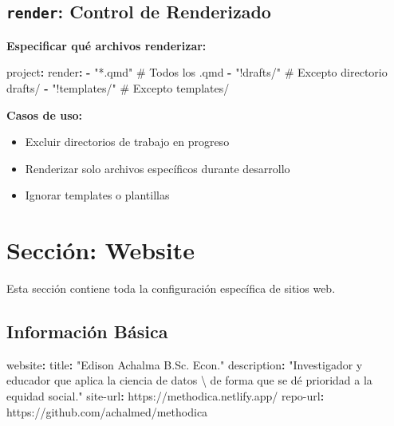 \documentclass[
  doc,
  floatsintext,
  longtable,
  a4paper,
  nolmodern,
  notxfonts,
  notimes,
  12pt,
  colorlinks=true,linkcolor=blue,citecolor=blue,urlcolor=blue]{apa7}
\newenvironment{Shaded}{\begin{snugshade}}{\end{snugshade}}
\newcommand{\AttributeTok}[1]{\textcolor[rgb]{0.40,0.45,0.13}{#1}}
\newcommand{\CommentTok}[1]{\textcolor[rgb]{0.37,0.37,0.37}{#1}}
\newcommand{\FunctionTok}[1]{\textcolor[rgb]{0.28,0.35,0.67}{#1}}
\newcommand{\KeywordTok}[1]{\textcolor[rgb]{0.00,0.23,0.31}{\textbf{#1}}}
\newcommand{\SpecialCharTok}[1]{\textcolor[rgb]{0.37,0.37,0.37}{#1}}
\newcommand{\StringTok}[1]{\textcolor[rgb]{0.13,0.47,0.30}{#1}}
\providecommand{\tightlist}{%
  \setlength{\itemsep}{0pt}\setlength{\parskip}{0pt}}
\begin{document}
\subsection{\texorpdfstring{\texttt{render}: Control de
Renderizado}{render: Control de Renderizado}}\label{render-control-de-renderizado}

\textbf{Especificar qué archivos renderizar:}

\begin{Shaded}
\begin{Highlighting}[]
\FunctionTok{project}\KeywordTok{:}
\AttributeTok{  }\FunctionTok{render}\KeywordTok{:}
\AttributeTok{    }\KeywordTok{{-}}\AttributeTok{ }\StringTok{"*.qmd"}\CommentTok{                    \# Todos los .qmd}
\AttributeTok{    }\KeywordTok{{-}}\AttributeTok{ }\StringTok{"!drafts/"}\CommentTok{                 \# Excepto directorio drafts/}
\AttributeTok{    }\KeywordTok{{-}}\AttributeTok{ }\StringTok{"!templates/"}\CommentTok{              \# Excepto templates/}
\end{Highlighting}
\end{Shaded}

\textbf{Casos de uso:}

\begin{itemize}
\tightlist
\item
  Excluir directorios de trabajo en progreso
\item
  Renderizar solo archivos específicos durante desarrollo
\item
  Ignorar templates o plantillas
\end{itemize}

\section{Sección: Website}\label{secciuxf3n-website}

Esta sección contiene toda la configuración específica de sitios web.

\subsection{Información Básica}\label{informaciuxf3n-buxe1sica}

\begin{Shaded}
\begin{Highlighting}[]
\FunctionTok{website}\KeywordTok{:}
\AttributeTok{  }\FunctionTok{title}\KeywordTok{:}\AttributeTok{ }\StringTok{"Edison Achalma B.Sc. Econ."}
\AttributeTok{  }\FunctionTok{description}\KeywordTok{:}\AttributeTok{ }\StringTok{"Investigador y educador que aplica la ciencia de datos }\SpecialCharTok{\textbackslash{} }
\StringTok{  de forma que se dé prioridad a la equidad social."}
\AttributeTok{  }\FunctionTok{site{-}url}\KeywordTok{:}\AttributeTok{ https://methodica.netlify.app/}
\AttributeTok{  }\FunctionTok{repo{-}url}\KeywordTok{:}\AttributeTok{ https://github.com/achalmed/methodica}
\end{Highlighting}
\end{Shaded}
\end{document}
